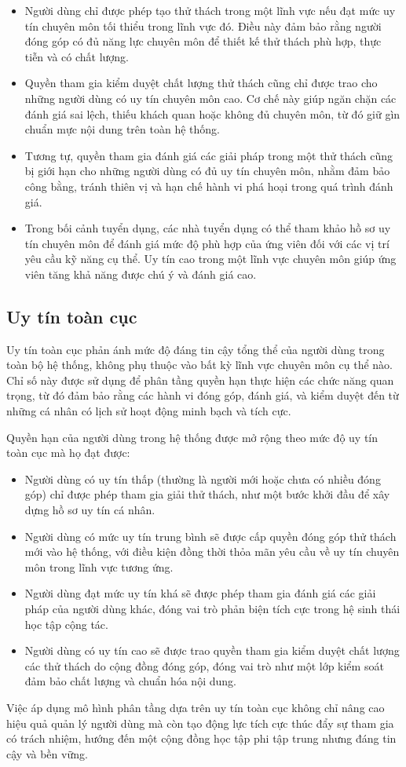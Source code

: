 \begin{itemize}
  \item Người dùng chỉ được phép tạo thử thách trong một lĩnh vực nếu đạt mức uy tín chuyên môn tối thiểu trong lĩnh vực đó. Điều này đảm bảo rằng người đóng góp có đủ năng lực chuyên môn để thiết kế thử thách phù hợp, thực tiễn và có chất lượng.
  \item Quyền tham gia kiểm duyệt chất lượng thử thách cũng chỉ được trao cho những người dùng có uy tín chuyên môn cao. Cơ chế này giúp ngăn chặn các đánh giá sai lệch, thiếu khách quan hoặc không đủ chuyên môn, từ đó giữ gìn chuẩn mực nội dung trên toàn hệ thống.
  \item Tương tự, quyền tham gia đánh giá các giải pháp trong một thử thách cũng bị giới hạn cho những người dùng có đủ uy tín chuyên môn, nhằm đảm bảo công bằng, tránh thiên vị và hạn chế hành vi phá hoại trong quá trình đánh giá.
  \item Trong bối cảnh tuyển dụng, các nhà tuyển dụng có thể tham khảo hồ sơ uy tín chuyên môn để đánh giá mức độ phù hợp của ứng viên đối với các vị trí yêu cầu kỹ năng cụ thể. Uy tín cao trong một lĩnh vực chuyên môn giúp ứng viên tăng khả năng được chú ý và đánh giá cao.
\end{itemize}

\subsection{Uy tín toàn cục}

Uy tín toàn cục phản ánh mức độ đáng tin cậy tổng thể của người dùng trong toàn bộ hệ thống, không phụ thuộc vào bất kỳ lĩnh vực chuyên môn cụ thể nào.
Chỉ số này được sử dụng để phân tầng quyền hạn thực hiện các chức năng quan trọng, từ đó đảm bảo rằng các hành vi đóng góp, đánh giá, và kiểm duyệt đến từ những cá nhân có lịch sử hoạt động minh bạch và tích cực.

Quyền hạn của người dùng trong hệ thống được mở rộng theo mức độ uy tín toàn cục mà họ đạt được:

\begin{itemize}
  \item Người dùng có uy tín thấp (thường là người mới hoặc chưa có nhiều đóng góp) chỉ được phép tham gia giải thử thách, như một bước khởi đầu để xây dựng hồ sơ uy tín cá nhân.
  \item Người dùng có mức uy tín trung bình sẽ được cấp quyền đóng góp thử thách mới vào hệ thống, với điều kiện đồng thời thỏa mãn yêu cầu về uy tín chuyên môn trong lĩnh vực tương ứng.
  \item Người dùng đạt mức uy tín khá sẽ được phép tham gia đánh giá các giải pháp của người dùng khác, đóng vai trò phản biện tích cực trong hệ sinh thái học tập cộng tác.
  \item Người dùng có uy tín cao sẽ được trao quyền tham gia kiểm duyệt chất lượng các thử thách do cộng đồng đóng góp, đóng vai trò như một lớp kiểm soát đảm bảo chất lượng và chuẩn hóa nội dung.
\end{itemize}

Việc áp dụng mô hình phân tầng dựa trên uy tín toàn cục không chỉ nâng cao hiệu quả quản lý người dùng mà còn tạo động lực tích cực thúc đẩy sự tham gia có trách nhiệm, hướng đến một cộng đồng học tập phi tập trung nhưng đáng tin cậy và bền vững.